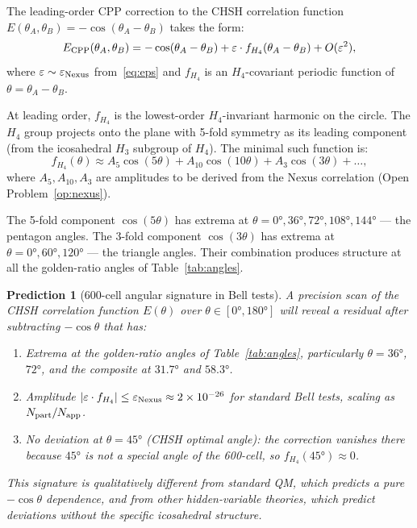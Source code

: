 \documentclass[11pt,letterpaper]{article}
\newtheorem{prediction}[theorem]{Prediction}
\newcommand{\eps}{\varepsilon}
\begin{document}
The leading-order CPP correction to the CHSH correlation function
$E(\theta_A, \theta_B) = -\cos(\theta_A - \theta_B)$ takes the form:
\begin{equation}
E_{\rm CPP}(\theta_A, \theta_B)
= -\cos(\theta_A - \theta_B)
  + \eps \cdot f_{H_4}(\theta_A - \theta_B) + O(\eps^2),
\label{eq:E_CPP}
\end{equation}
where $\eps \sim \eps_{\rm Nexus}$ from~\eqref{eq:eps} and
$f_{H_4}$ is an $H_4$-covariant periodic function of
$\theta = \theta_A - \theta_B$.

At leading order, $f_{H_4}$ is the lowest-order $H_4$-invariant
harmonic on the circle.  The $H_4$ group projects onto the plane
with 5-fold symmetry as its leading component (from the icosahedral
$H_3$ subgroup of $H_4$).  The minimal such function is:
\begin{equation}
f_{H_4}(\theta) \approx A_5 \cos(5\theta) + A_{10}\cos(10\theta)
+ A_3 \cos(3\theta) + \ldots,
\label{eq:f_H4}
\end{equation}
where $A_5, A_{10}, A_3$ are amplitudes to be derived from the Nexus
correlation (Open Problem~\ref{op:nexus}).

The 5-fold component $\cos(5\theta)$ has extrema at $\theta = 0°,
36°, 72°, 108°, 144°$ --- the pentagon angles.  The 3-fold component
$\cos(3\theta)$ has extrema at $\theta = 0°, 60°, 120°$ --- the
triangle angles.  Their combination produces structure at all the
golden-ratio angles of Table~\ref{tab:angles}.

\begin{prediction}[600-cell angular signature in Bell tests]
\label{pred:angular}
A precision scan of the CHSH correlation function $E(\theta)$ over
$\theta \in [0°, 180°]$ will reveal a residual after subtracting
$-\cos\theta$ that has:
\begin{enumerate}
\item Extrema at the golden-ratio angles of Table~\ref{tab:angles},
  particularly $\theta = 36°$, $72°$, and the composite at $31.7°$
  and $58.3°$.
\item Amplitude $|\eps \cdot f_{H_4}| \leq \eps_{\rm Nexus}
  \approx 2 \times 10^{-26}$ for standard Bell tests,
  scaling as $N_{\rm part}/N_{\rm app}$.
\item No deviation at $\theta = 45°$ (CHSH optimal angle): the
  correction vanishes there because $45°$ is not a special angle
  of the 600-cell, so $f_{H_4}(45°) \approx 0$.
\end{enumerate}
This signature is \emph{qualitatively} different from standard QM,
which predicts a pure $-\cos\theta$ dependence, and from other
hidden-variable theories, which predict deviations without the
specific icosahedral structure.
\end{prediction}
\end{document}
